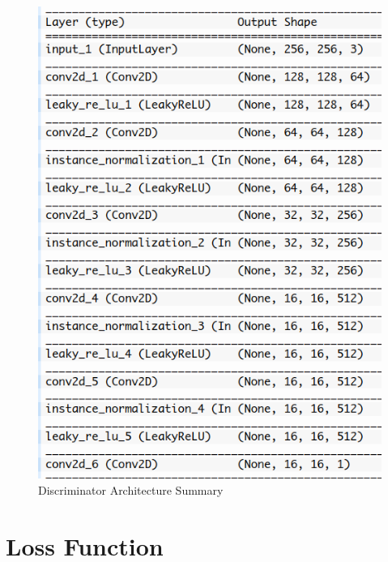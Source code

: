 \begin{figure}[p]
    \centering
    \includegraphics[width=1\textwidth]{chapter/output/disc_summary.png}
    \caption{Discriminator Architecture Summary}
    \label{fig:gen_summary}
\end{figure}




\newpage
\section{Loss Function}

